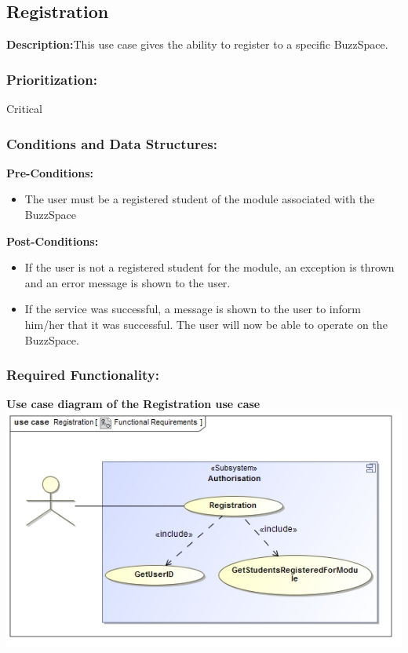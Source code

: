 \documentclass[a4paper,11pt]{article}
\begin{document}
\subsection{Registration}
\textbf{Description:}This use case gives the ability to register to a specific BuzzSpace.
\subsubsection{Prioritization:} Critical
\subsubsection{Conditions and Data Structures:}
\textbf{Pre-Conditions:}
\begin{itemize}
	\item The user must be a registered student of the module associated with the BuzzSpace
\end{itemize}
\textbf{Post-Conditions:}
\begin{itemize}
	\item If the user is not a registered student for the module, an exception is thrown and an error message is shown to the user.
	\item If the service was successful, a message is shown to the user to inform him/her that it was successful. The user will now be able to operate on the BuzzSpace.
\end{itemize}
\subsubsection{Required Functionality:} 
\textbf{Use case diagram of the Registration use case}\\
\includegraphics[width=1\linewidth]{./Images/Author/Registration.jpg}\\
\end{document}
